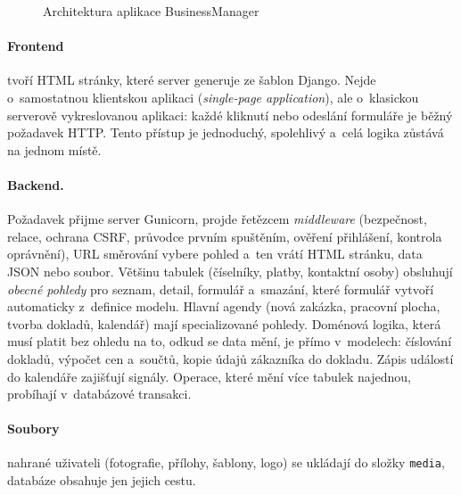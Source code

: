 \begin{figure}[htbp]
\caption{Architektura aplikace BusinessManager}\label{fig:architektura}
\end{figure}

\paragraph{Frontend} tvoří HTML stránky, které server generuje ze šablon Django. Nejde o~samostatnou klientskou aplikaci (\emph{single-page application}), ale o~klasickou serverově vykreslovanou aplikaci: každé kliknutí nebo odeslání formuláře je běžný požadavek HTTP. Tento přístup je jednoduchý, spolehlivý a~celá logika zůstává na jednom místě.

\paragraph{Backend.} Požadavek přijme server Gunicorn, projde řetězcem \emph{middleware} (bezpečnost, relace, ochrana CSRF, průvodce prvním spuštěním, ověření přihlášení, kontrola oprávnění), URL směrování vybere pohled a~ten vrátí HTML stránku, data JSON nebo soubor. Většinu tabulek (číselníky, platby, kontaktní osoby) obsluhují \emph{obecné pohledy} pro seznam, detail, formulář a~smazání, které formulář vytvoří automaticky z~definice modelu. Hlavní agendy (nová zakázka, pracovní plocha, tvorba dokladů, kalendář) mají specializované pohledy. Doménová logika, která musí platit bez ohledu na to, odkud se data mění, je přímo v~modelech: číslování dokladů, výpočet cen a~součtů, kopie údajů zákazníka do dokladu. Zápis událostí do kalendáře zajišťují signály. Operace, které mění více tabulek najednou, probíhají v~databázové transakci.

\paragraph{Soubory} nahrané uživateli (fotografie, přílohy, šablony, logo) se ukládají do složky \texttt{media}, databáze obsahuje jen jejich cestu.

